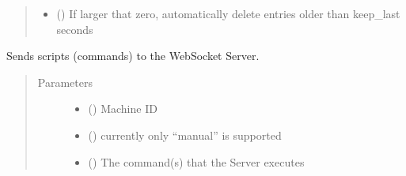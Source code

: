 \documentclass[letterpaper,10pt,english,openany,oneside]{sphinxmanual}
\begin{document}
\begin{fulllineitems}
\begin{fulllineitems}
\begin{quote}
\begin{description}
\begin{itemize}
\item {} 
 () \textendash{} If larger that zero, automatically delete entries older than keep\_last seconds

\end{itemize}

\end{description}\end{quote}

\end{fulllineitems}


\begin{fulllineitems}
\label{\detokenize{_modules/AconitySTUDIO_client:AconitySTUDIO_client.AconitySTUDIO_client.execute}}
Sends scripts (commands) to the WebSocket Server.
\begin{quote}\begin{description}
\item[{Parameters}] \leavevmode\begin{itemize}
\item {} 
 () \textendash{} Machine ID

\item {} 
 () \textendash{} currently only “manual” is supported

\item {} 
 () \textendash{} The command(s) that the Server executes

\end{itemize}

\end{description}\end{quote}

\end{fulllineitems}



\end{fulllineitems}
\end{document}
